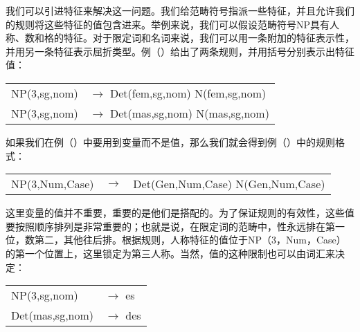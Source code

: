 我们可以引进特征来解决这一问题。我们给范畴符号指派一些特征，并且允许我们的规则将这些特征的值包含进来。举例来说，我们可以假设范畴符号NP具有人称、数和格的特征。对于限定词和名词来说，我们可以用一条附加的特征表示性，并用另一条特征表示屈折类型。例（）给出了两条规则，并用括号分别表示出特征值：

\ea
\begin{tabular}[t]{@{}l@{ }l}
NP(3,sg,nom)  & $\to$ Det(fem,sg,nom) N(fem,sg,nom)\\
NP(3,sg,nom)  & $\to$ Det(mas,sg,nom) N(mas,sg,nom)\\
\end{tabular}
\z
如果我们在例（）中要用到变量而不是值，那么我们就会得到例（）中的规则格式：
\ea
\label{Regel-mit-Variablen}
\begin{tabular}[t]{@{}l@{ }l@{ }l}
NP({3},{Num},{Case}) & $\to$ & Det(Gen,{Num},{Case}) N(Gen,{Num},{Case})\\
\end{tabular}
\z
这里变量的值并不重要，重要的是他们是搭配的。为了保证规则的有效性，这些值要按照顺序排列是非常重要的；也就是说，在限定词的范畴中，性永远排在第一位，数第二，其他往后排。根据规则，人称特征的值位于NP（3，Num，Case）的第一个位置上，这里锁定为第三人称。当然，值的这种限制也可以由词汇来决定：
\ea
\begin{tabular}[t]{@{}l@{ }l}
NP(3,sg,nom)  & $\to$ es\\
Det(mas,sg,nom)  & $\to$ des\\
\end{tabular}
\z

